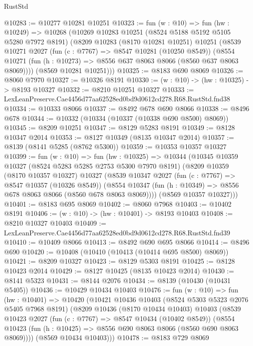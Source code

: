 \begin{lexlean}{RustStd}
\begin{coremodule}
@10283 := @10277 @10281 @10251
@10323 := fun (w : @10) =>
  fun (hw : @10249) =>
  @10268
    (@10269
      @10283
      @10251
      (@8524 @5188 @5192 @5105 @5280 @7972 @8191)
      (@8209
        @10283
        (@8170 @10281 @10251)
        @10251
        (@8539
          @10271
          @2027
          (fun (c : @7767) => @8547 @10281 (@10250 @8549))
          (@8554 @10271 (fun (h : @10273) => @8556 @637 @8063 @8066 (@8560 @637 @8063 @8069))))
        (@8569 @10281 @10251)))
@10325 := @8183 @690 @8069
@10326 := @8060 @7970
@10327 := @10326 @8191
@10330 := (w : @10) -> (hw : @10325) -> @8193 @10327
@10332 := @8210 @10251 @10327
@10333 := LexLeanPreserve.Cae4456d77aa62528ed0bd9d0612cd278.R68.RustStd.fnd38
@10334 := @10333 @8066
@10337 := @8492 @678 @690 @8066
@10338 := @8496 @678
@10344 := @10332 (@10334 (@10337 (@10338 @690 @8500) @8069))
@10345 := @8209 @10251
@10347 := @8129 @5283 @8191
@10349 := @8128 @10347 @2014
@10353 := @8127 @10349 (@8135 @10347 @2014)
@10357 := @8139 (@8141 @5285 (@8762 @5300))
@10359 := @10353 @10357 @10327
@10399 := fun (w : @10) =>
  fun (hw : @10325) =>
  @10344
    (@10345
      @10359
      @10327
      (@8524 @5283 @5285 @2753 @5300 @7970 @8191)
      (@8209
        @10359
        (@8170 @10357 @10327)
        @10327
        (@8539
          @10347
          @2027
          (fun (c : @7767) => @8547 @10357 (@10326 @8549))
          (@8554 @10347 (fun (h : @10349) => @8556 @678 @8063 @8066 (@8560 @678 @8063 @8069))))
        (@8569 @10357 @10327)))
@10401 := @8183 @695 @8069
@10402 := @8060 @7968
@10403 := @10402 @8191
@10406 := (w : @10) -> (hw : @10401) -> @8193 @10403
@10408 := @8210 @10327 @10403
@10409 := LexLeanPreserve.Cae4456d77aa62528ed0bd9d0612cd278.R68.RustStd.fnd39
@10410 := @10409 @8066
@10413 := @8492 @690 @695 @8066
@10414 := @8496 @690
@10420 := @10408 (@10410 (@10413 (@10414 @695 @8500) @8069))
@10421 := @8209 @10327
@10423 := @8129 @5303 @8191
@10425 := @8128 @10423 @2014
@10429 := @8127 @10425 (@8135 @10423 @2014)
@10430 := @8141 @5323
@10431 := @8144 @2076
@10434 := @8139 (@10430 (@10431 @5405))
@10436 := @10429 @10434 @10403
@10476 := fun (w : @10) =>
  fun (hw : @10401) =>
  @10420
    (@10421
      @10436
      @10403
      (@8524 @5303 @5323 @2076 @5405 @7968 @8191)
      (@8209
        @10436
        (@8170 @10434 @10403)
        @10403
        (@8539
          @10423
          @2027
          (fun (c : @7767) => @8547 @10434 (@10402 @8549))
          (@8554 @10423 (fun (h : @10425) => @8556 @690 @8063 @8066 (@8560 @690 @8063 @8069))))
        (@8569 @10434 @10403)))
@10478 := @8183 @729 @8069

\end{coremodule}
\end{lexlean}
